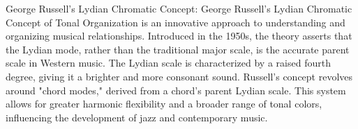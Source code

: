 George Russell's Lydian Chromatic Concept:
George Russell's Lydian Chromatic Concept of Tonal Organization is an innovative approach to understanding and organizing musical relationships. Introduced in the 1950s, the theory asserts that the Lydian mode, rather than the traditional major scale, is the accurate parent scale in Western music. The Lydian scale is characterized by a raised fourth degree, giving it a brighter and more consonant sound. Russell's concept revolves around "chord modes," derived from a chord's parent Lydian scale. This system allows for greater harmonic flexibility and a broader range of tonal colors, influencing the development of jazz and contemporary music.